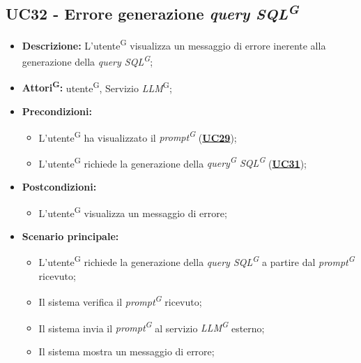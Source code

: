 \subsection{UC32 - Errore generazione \textit{query SQL\textsuperscript{G}}}
\label{sec:UC32}
\begin{itemize}
	\item \textbf{Descrizione:} L'utente\textsuperscript{G} visualizza un messaggio di errore inerente alla generazione della \textit{query SQL\textsuperscript{G}};
	\item \textbf{Attori\textsuperscript{G}:} utente\textsuperscript{G}, Servizio \textit{LLM}\textsuperscript{G};
	\item \textbf{Precondizioni:} 
	\begin{itemize}
		\item L'utente\textsuperscript{G} ha visualizzato il \textit{prompt\textsuperscript{G}} (\hyperref[sec:UC29]{\textbf{UC29}});
		\item L'utente\textsuperscript{G} richiede la generazione della \textit{query\textsuperscript{G} SQL\textsuperscript{G}} (\hyperref[sec:UC31]{\textbf{UC31}});
	\end{itemize}
	\item \textbf{Postcondizioni:} 
	\begin{itemize}
		\item L'utente\textsuperscript{G} visualizza un messaggio di errore;
	\end{itemize}
	\item \textbf{Scenario principale:}
	\begin{itemize}
		\item L'utente\textsuperscript{G} richiede la generazione della \textit{query SQL\textsuperscript{G}} a partire dal \textit{prompt\textsuperscript{G}} ricevuto;
		\item Il sistema verifica il \textit{prompt\textsuperscript{G}} ricevuto;
		\item Il sistema invia il \textit{prompt\textsuperscript{G}} al servizio \textit{LLM\textsuperscript{G}} esterno;
		\item Il sistema mostra un messaggio di errore;
	\end{itemize}
\end{itemize}


